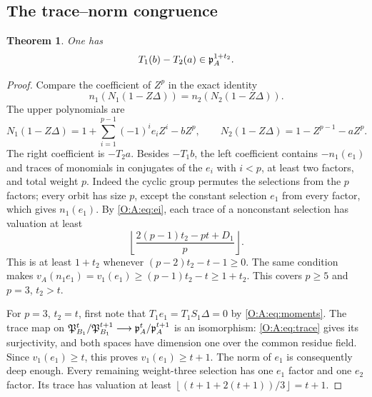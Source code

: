 \documentclass[11pt]{amsart}
\newtheorem{theorem}{Theorem}[section]
\theoremstyle{definition}
\theoremstyle{remark}
\newcommand{\floor}[1]{\left\lfloor #1\right\rfloor}
\begin{document}
\subsection{The trace--norm congruence}
\begin{theorem}\label{O:A:thm:H14}
One has
\[
 T_1(b)-T_2(a)\in\mathfrak p_A^{1+t_2}.
\]
\end{theorem}
\begin{proof}
Compare the coefficient of $Z^p$ in the exact identity
\[
 n_1(N_1(1-Z\Delta))=n_2(N_2(1-Z\Delta)).
\]
The upper polynomials are
\[
 N_1(1-Z\Delta)=1+\sum_{i=1}^{p-1}(-1)^ie_iZ^i-bZ^p,
 \qquad N_2(1-Z\Delta)=1-Z^{p-1}-aZ^p.
\]
The right coefficient is $-T_2a$.  Besides $-T_1b$, the left coefficient
contains $-n_1(e_1)$ and traces of monomials in conjugates of the $e_i$
with $i<p$, at least two factors, and total weight $p$.
Indeed the cyclic group permutes the selections from the $p$ factors;
every orbit has size $p$, except the constant selection $e_1$ from every
factor, which gives $n_1(e_1)$.
By \eqref{O:A:eq:ei}, each trace of a nonconstant selection has valuation at least
\[
 \floor{\frac{2(p-1)t_2-pt+D_1}{p}}.
\]
This is at least $1+t_2$ whenever
$(p-2)t_2-t-1\ge0$.  The same condition makes
$v_A(n_1e_1)=v_1(e_1)\ge(p-1)t_2-t\ge1+t_2$.
This covers $p\ge5$ and $p=3$, $t_2>t$.

For $p=3$, $t_2=t$, first note that $T_1e_1=T_1S_1\Delta=0$ by
\eqref{O:A:eq:moments}.  The trace map on
$\mathfrak P_{B_1}^t/\mathfrak P_{B_1}^{t+1}\longrightarrow
 \mathfrak p_A^t/\mathfrak p_A^{t+1}$ is an isomorphism: \eqref{O:A:eq:trace} gives its
surjectivity, and both spaces have dimension one over the common residue
field.  Since $v_1(e_1)\ge t$, this proves $v_1(e_1)\ge t+1$.
The norm of $e_1$ is consequently deep enough.  Every remaining weight-three
selection has one $e_1$ factor and one $e_2$ factor.  Its trace has valuation
at least $\floor{(t+1+2(t+1))/3}=t+1$.
\end{proof}
\end{document}
